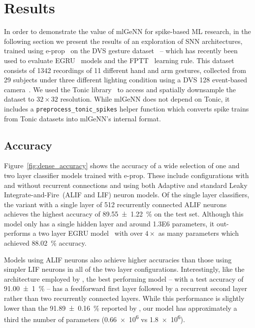 \documentclass[sigconf]{acmart}
\begin{document}
\section{Results}
In order to demonstrate the value of mlGeNN for spike-based ML research, in the following section we present the results of an exploration of SNN architectures, trained using e-prop~\citep{Bellec2020} on the DVS gesture dataset~\citep{amir_low_2017} -- which has recently been used to evaluate EGRU~\citep{subramoney2022egru} models and the FPTT~\citep{yin2021accurate} learning rule.
This dataset consists of \num{1342} recordings of \num{11} different hand and arm gestures, collected from \num{29} subjects under three different lighting condition using a DVS 128 event-based camera~\citep{lichtsteiner_128times128_2008}.
We used the Tonic library~\citep{lenz_gregor_2021_5079802} to access and spatially downsample the dataset to $32\times32$ resolution.
While mlGeNN does not depend on Tonic, it includes a \lstinline{preprocess_tonic_spikes} helper function which converts spike trains from Tonic datasets into mlGeNN's internal format.

\subsection{Accuracy}
Figure~\ref{fig:dense_accuracy} shows the accuracy of a wide selection of one and two layer classifier models trained with e-prop.
These include configurations with and without recurrent connections and using both Adaptive and standard Leaky Integrate-and-Fire~(ALIF and LIF) neuron models.
Of the single layer classifiers, the variant with a single layer of 512 recurrently connected ALIF neurons achieves the highest accuracy of \SI{89.55 \pm 1.22}{\percent} on the test set.
Although this model only has a single hidden layer and around \num{1.3E6} parameters, it out-performs a two layer EGRU model~\citep{subramoney2022egru} with over $4\times$ as many parameters which achieved \SI{88.02}{\percent} accuracy.

Models using ALIF neurons also achieve higher accuracies than those using simpler LIF neurons in all of the two layer configurations.
Interestingly, like the architecture employed by \citet{yin2021accurate}, the best performing model -- with a test accuracy of \SI{91.00 \pm 1}{\percent} -- has a feedforward first layer followed by a recurrent second layer rather than two recurrently connected layers.
While this performance is slightly lower than the \SI{91.89 \pm 0.16}{\percent} reported by \citet{yin2021accurate}, our model has approximately a third the number of parameters (\num{0.66e6} vs \num{1.8e6}).
\end{document}
